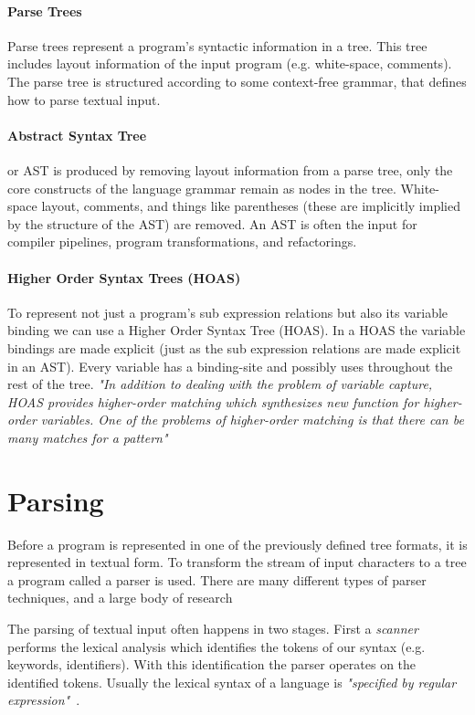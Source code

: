 \paragraph{Parse Trees}
Parse trees represent a program's syntactic information in a tree. This tree includes layout information of the input program (e.g. white-space, comments). The parse tree is structured according to some context-free grammar, that defines how to parse textual input.

\paragraph{Abstract Syntax Tree}
or AST is produced by removing layout information from a parse tree, only the core constructs of the language grammar remain as nodes in the tree. White-space layout, comments, and things like parentheses (these are implicitly implied by the structure of the AST) are removed. An AST is often the input for compiler pipelines, program transformations, and refactorings.

\paragraph{Higher Order Syntax Trees (HOAS)}
To represent not just a program's sub expression relations but also its variable binding we can use a Higher Order Syntax Tree (HOAS)\cite{Pfenning1988}. In a HOAS the variable bindings are made explicit (just as the sub expression relations are made explicit in an AST). Every variable has a binding-site and possibly uses throughout the rest of the tree. \textit{"In addition to dealing with the problem of variable capture, HOAS provides higher-order matching which synthesizes new function for higher-order  variables. One of the problems of higher-order matching is that there can be many matches for a pattern"}~\cite{Visser2001}

\section{Parsing} \label{parsing}
Before a program is represented in one of the previously defined tree formats, it is represented in textual form. To transform the stream of input characters to a tree a program called a parser is used. There are many different types of parser techniques, and a large body of research~\cite{Visser1997,VandenBrand2002,Salomon1989}

The parsing of textual input often happens in two stages. First a \textit{scanner} performs the lexical analysis which identifies the tokens of our syntax (e.g. keywords, identifiers). With this identification the parser operates on the identified tokens. Usually the lexical syntax of a language is \textit{"specified by regular expression"}~\cite{Bravenboer2004}.

